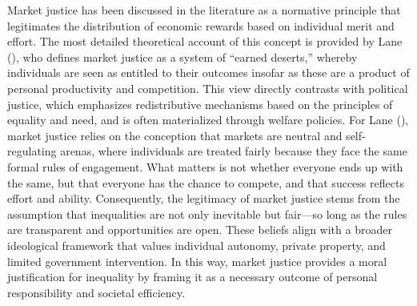 \documentclass[
  12pt,
]{article}
\begin{document}
Market justice has been discussed in the literature as a normative
principle that legitimates the distribution of economic rewards based on
individual merit and effort. The most detailed theoretical account of
this concept is provided by Lane
(), who defines market justice as a
system of ``earned deserts,'' whereby individuals are seen as entitled
to their outcomes insofar as these are a product of personal
productivity and competition. This view directly contrasts with
political justice, which emphasizes redistributive mechanisms based on
the principles of equality and need, and is often materialized through
welfare policies. For Lane (),
market justice relies on the conception that markets are neutral and
self-regulating arenas, where individuals are treated fairly because
they face the same formal rules of engagement. What matters is not
whether everyone ends up with the same, but that everyone has the chance
to compete, and that success reflects effort and ability. Consequently,
the legitimacy of market justice stems from the assumption that
inequalities are not only inevitable but fair---so long as the rules are
transparent and opportunities are open. These beliefs align with a
broader ideological framework that values individual autonomy, private
property, and limited government intervention. In this way, market
justice provides a moral justification for inequality by framing it as a
necessary outcome of personal responsibility and societal efficiency.
\end{document}
